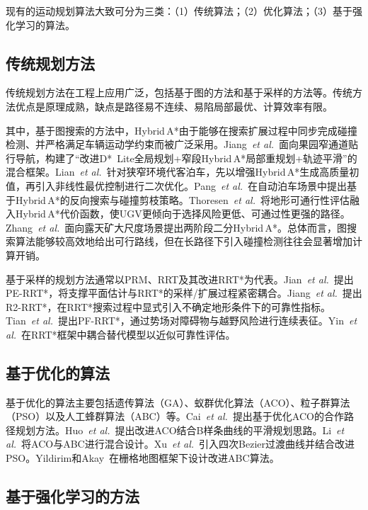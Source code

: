 \documentclass{iopjournal}
\newcommand{\etal}{\textit{et al.}}
\begin{document}
现有的运动规划算法大致可分为三类：（1）传统算法；（2）优化算法；（3）基于强化学习的算法。

\subsection{传统规划方法}

传统规划方法在工程上应用广泛，包括基于图的方法和基于采样的方法等。传统方法优点是原理成熟，缺点是路径易不连续、易陷局部最优、计算效率有限。

其中，基于图搜索的方法中，Hybrid\,A*由于能够在搜索扩展过程中同步完成碰撞检测、并严格满足车辆运动学约束而被广泛采用。Jiang~\etal~\cite{jiang2025hybrid}面向果园窄通道贴行导航，构建了``改进D*~Lite全局规划+窄段Hybrid\,A*局部重规划+轨迹平滑''的混合框架。Lian~\etal~\cite{lian2023trajectory}针对狭窄环境代客泊车，先以增强Hybrid\,A*生成高质量初值，再引入非线性最优控制进行二次优化。Pang~\etal~\cite{pang2022curvature}在自动泊车场景中提出基于Hybrid\,A*的反向搜索与碰撞剪枝策略。Thoresen~\etal~\cite{thoresen2021path}将地形可通行性评估融入Hybrid\,A*代价函数，使UGV更倾向于选择风险更低、可通过性更强的路径。Zhang~\etal~\cite{zhang2024twostage}面向露天矿大尺度场景提出两阶段二分Hybrid\,A*。总体而言，图搜索算法能够较高效地给出可行路线，但在长路径下引入碰撞检测往往会显著增加计算开销。

基于采样的规划方法通常以PRM、RRT及其改进RRT*为代表。Jian~\etal~\cite{jian2024path}提出PE-RRT*，将支撑平面估计与RRT*的采样/扩展过程紧密耦合。Jiang~\etal~\cite{jiang2022r2rrt}提出R2-RRT*，在RRT*搜索过程中显式引入不确定地形条件下的可靠性指标。Tian~\etal~\cite{tian2023driving}提出PF-RRT*，通过势场对障碍物与越野风险进行连续表征。Yin~\etal~\cite{yin2023efficient}在RRT*框架中耦合替代模型以近似可靠性评估。

\subsection{基于优化的算法}

基于优化的算法主要包括遗传算法（GA）、蚁群优化算法（ACO）、粒子群算法（PSO）以及人工蜂群算法（ABC）等。Cai~\etal~\cite{cai2024cooperative}提出基于优化ACO的合作路径规划方法。Huo~\etal~\cite{huo2024smooth}提出改进ACO结合B样条曲线的平滑规划思路。Li~\etal~\cite{li2023mixing}将ACO与ABC进行混合设计。Xu~\etal~\cite{xu2022quartic}引入四次Bezier过渡曲线并结合改进PSO。Yildirim和Akay~\cite{yildirim2025efficient}在栅格地图框架下设计改进ABC算法。

\subsection{基于强化学习的方法}
\end{document}
